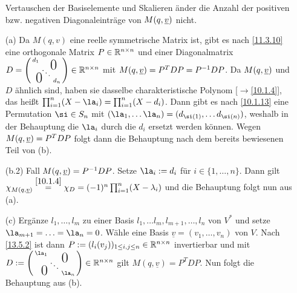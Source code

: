 \documentclass[../../main.tex]{subfiles}
\begin{document}
\begin{cproof}
\begin{itemize}
\begin{behbox}
            \hbeg{} 
                Vertauschen der Basiselemente und Skalieren änder die Anzahl der positiven bzw. negativen Diagonaleinträge von $M(q,{\underline v})$ nicht.
        \end{behbox}
        \item[(a)] 
            Da $M(q,v)$ eine reelle symmetrische Matrix ist, gibt es nach \ref{11.3.10} eine orthogonale Matrix $P\in \mathbb R^{n\times n} $ und einer Diagonalmatrix $D=\left(
                \begin{smallmatrix}
                    d_1 & & \llap{$\overset{\blap{\LARGE 0}}{~}$} \\
                    & \ddots &\\
                    \rlap{\tlap{\LARGE 0}} & & d_n
                \end{smallmatrix}
            \right)\in \R^{n\times n}$ mit $M(q,{\underline v})=P^TDP=P^{-1}DP$. Da $M(q,{\underline v})$ und $D$ ähnlich sind, haben sie dasselbe charakteristische Polynom [$\to$\ref{10.1.4}], das heißt $\prod_{i=1}^n(X-\la_i)=\prod_{i=1}^n(X-d_i)$. Dann gibt es nach \ref{10.1.13} eine Permutation $\si\in S_n$ mit $(\la_1,\ldots \la_n)=(d_{\si(1)},\ldots d_{\si(n)})$, weshalb in der Behauptung die $\la_i$ durch die $d_i$ ersetzt werden können. Wegen $M(q,{\underline v})=P^TDP$ folgt dann die Behauptung nach dem bereits bewiesenen Teil von (b).
        \item[(b.2)] Fall $M(q,{\underline v})=P^{-1}DP$. 
            Setze $\la_i:= d_i$ für $i\in\{1,\ldots ,n\}$. Dann gilt $\chi_{M(q,{\underline v})}\stackrel{\ref{10.1.4}}{=}\chi_D=(-1)^n\prod_{i=1}^n(X-\lambda_i)$ und die Behauptung folgt nun aus (a).
        \item[(c)] 
            Ergänze $l_1,\ldots ,l_m$ zu einer Basis $l_1,\ldots l_m,l_{m+1},\ldots ,l_n$ von $V^*$ und setze $\la_{m+1}=\ldots =\la_n=0$. Wähle eine Basis $\underline{v}=(v_1,\ldots ,v_n)$ von $V$. Nach \ref{13.5.2} ist dann $P:=(l_i(v_j))_{1\le i,j\le n}\in \mathbb R^{n\times n}$ invertierbar und mit $D:=\left(
                \begin{smallmatrix}
                    \la_1 & & \llap{$\overset{\blap{\LARGE 0}}{~}$} \\
                    & \ddots &\\
                    \rlap{\tlap{\LARGE 0}} & & \la_n
                \end{smallmatrix}
            \right)\in \R^{n\times n}$ gilt $M(q,\underline{v})=P^TDP$. Nun folgt die Behauptung aus (b).
    \end{itemize} 
\end{cproof}
\end{document}
